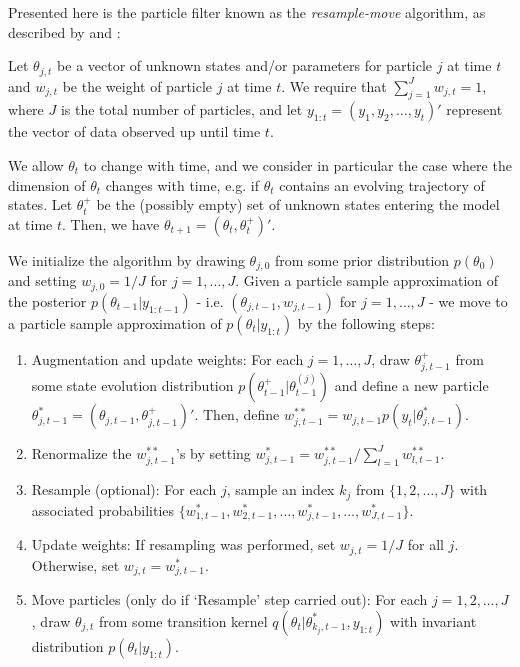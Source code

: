\documentclass{article}
\begin{document}
Presented here is the particle filter known as the \emph{resample-move} algorithm, as described by \citet{Gilk:Berz:foll:2001} and \citet{Berz:gilk:2001}:

Let $\theta_{j,t}$ be a vector of unknown states and/or parameters for particle $j$ at time $t$ and $w_{j,t}$ be the weight of particle $j$ at time $t$. We require that $\sum_{j=1}^J w_{j,t} = 1$, where $J$ is the total number of particles, and let $y_{1:t} = (y_1,y_2,\ldots,y_t)'$ represent the vector of data observed up until time $t$.

We allow $\theta_t$ to change with time, and we consider in particular the case where the dimension of $\theta_t$ changes with time, e.g. if $\theta_t$ contains an evolving trajectory of states. Let $\theta^{+}_t$ be the (possibly empty) set of unknown states entering the model at time $t$. Then, we have $\theta_{t+1} = (\theta_t,\theta^{+}_t)'$.

We initialize the algorithm by drawing $\theta_{j,0}$ from some prior distribution $p(\theta_0)$ and setting $w_{j,0} = 1 / J$ for $j = 1,\ldots,J$. Given a particle sample approximation of the posterior $p(\theta_{t-1}|y_{1:t-1})$ - i.e. $\left(\theta_{j,t-1}, w_{j,t-1}\right)$ for $j=1,\ldots,J$ - we move to a particle sample approximation of $p(\theta_t|y_{1:t})$ by the following steps:

\begin{enumerate}
\item Augmentation and update weights: For each $j = 1,\ldots,J$, draw $\theta^{+}_{j,t-1}$ from some state evolution distribution $p(\theta^{+}_{t-1}|\theta^{(j)}_{t-1})$ and define a new particle $\theta^{*}_{j,t-1} = (\theta_{j,t-1},\theta^{+}_{j,t-1})'$. Then, define $w^{**}_{j,t-1} = w_{j,t-1}p(y_t|\theta^{*}_{j,t-1})$.
\item Renormalize the $w^{**}_{j,t-1}$'s by setting $w^{*}_{j,t-1} = w^{**}_{j,t-1} / \sum_{l=1}^J w^{**}_{l,t-1}$.
\item Resample (optional): For each $j$, sample an index $k_j$ from $\{1,2,\ldots,J\}$ with associated probabilities $\{w^{*}_{1,t-1},w^{*}_{2,t-1},\ldots,w^{*}_{j,t-1},\ldots,w^{*}_{J,t-1}\}$.
\item Update weights: If resampling was performed, set $w_{j,t} = 1 / J$ for all $j$. Otherwise, set $w_{j,t} = w^{*}_{j,t-1}$.
\item Move particles (only do if `Resample' step carried out): For each $j = 1,2,\ldots,J$, draw $\theta_{j,t}$ from some transition kernel $q(\theta_t|\theta^{*}_{k_j,t-1},y_{1:t})$ with invariant distribution $p(\theta_t|y_{1:t})$.
\end{enumerate}

\clearpage



\end{document}
